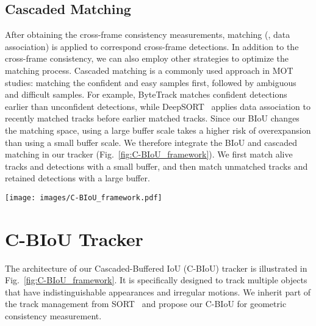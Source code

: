 \documentclass[journal]{IEEEtran}
\begin{document}
\subsection{Cascaded Matching}
After obtaining the cross-frame consistency measurements, matching (\ie, data association) is applied to correspond cross-frame detections. In addition to the cross-frame consistency, we can also employ other strategies to optimize the matching process. Cascaded matching is a commonly used approach in MOT studies: matching the confident and easy samples first, followed by ambiguous and difficult samples. For example, ByteTrack\cite{bytetrack} matches confident detections earlier than unconfident detections, while DeepSORT~\cite{DeepSORT} applies data association to recently matched tracks before earlier matched tracks.
Since our BIoU changes the matching space, using a large buffer scale takes a higher risk of overexpansion than using a small buffer scale. We therefore integrate the BIoU and cascaded matching in our tracker (Fig.~\ref{fig:C-BIoU_framework}). We first match alive tracks and detections with a small buffer, and then match unmatched tracks and retained detections with a large buffer. 


\begin{figure*}[h!]
   \centering
   \texttt{[image: images/C-BIoU\_framework.pdf]}
   \caption{\textbf{Framework of Our C-BIoU Tracker.} Which initializes tracks from unmatched detections, applies the alive tracks to match new detections, and terminates a track when it has not been matched for a given amount of frames (\ie, ). Two BIoUs, which respectively equip small and large buffers, are grouped into a cascaded matching. First, we match alive tracks and detections with the BIoU that has a small buffer (\ie, ). Then, we continue to match unmatched tracks and detections with the BIoU that has a large buffer (\ie, ). For the motion estimation, we simply average the speeds of recent frames to quickly respond to unpredictable motion changes. }
   \label{fig:C-BIoU_framework}
\end{figure*}




\section{C-BIoU Tracker}

The architecture of our Cascaded-Buffered IoU (C-BIoU) tracker is illustrated in Fig.~\ref{fig:C-BIoU_framework}. It is specifically designed to track multiple objects that have indistinguishable appearances and irregular motions. We inherit part of the track management from SORT~\cite
{SORT} and propose our C-BIoU for geometric consistency measurement. 
\end{document}
